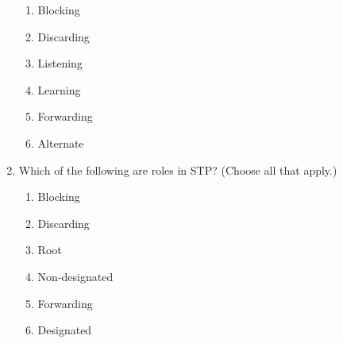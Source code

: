 \begin{enumerate}
  \begin{enumerate}
    \item
    Blocking
  \item
    Discarding
  \item
    Listening
  \item
    Learning
  \item
    Forwarding
  \item
    Alternate
  \end{enumerate}
\item
  Which of the following are roles in STP? (Choose all that apply.)

  \begin{enumerate}
    \item
    Blocking
  \item
    Discarding
  \item
    Root
  \item
    Non-designated
  \item
    Forwarding
  \item
    Designated
  \end{enumerate}
\end{enumerate}

